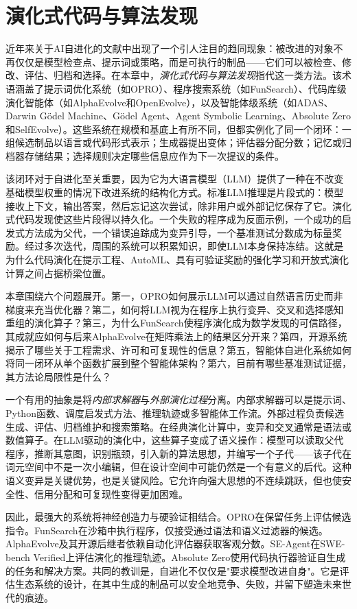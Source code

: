 
\section{演化式代码与算法发现}
\label{sec:evolutionary-code-algorithm-discovery}

近年来关于AI自进化的文献中出现了一个引人注目的趋同现象：被改进的对象不再仅仅是模型检查点、提示词或策略，而是可执行的制品——它们可以被检查、修改、评估、归档和选择。在本章中，\emph{演化式代码与算法发现}指代这一类方法。该术语涵盖了提示词优化系统（如OPRO）、程序搜索系统（如FunSearch）、代码库级演化智能体（如AlphaEvolve和OpenEvolve），以及智能体级系统（如ADAS、Darwin G{\"o}del Machine、G{\"o}del Agent、Agent Symbolic Learning、Absolute Zero和SelfEvolve）。这些系统在规模和基底上有所不同，但都实例化了同一个闭环：一组候选制品以语言或代码形式表示；生成器提出变体；评估器分配分数；记忆或归档器存储结果；选择规则决定哪些信息应作为下一次提议的条件。

该闭环对于自进化至关重要，因为它为大语言模型（LLM）提供了一种在不改变基础模型权重的情况下改进系统的结构化方式。标准LLM推理是片段式的：模型接收上下文，输出答案，然后忘记这次尝试，除非用户或外部记忆保存了它。演化式代码发现使这些片段得以持久化。一个失败的程序成为反面示例，一个成功的启发式方法成为父代，一个错误追踪成为变异引导，一个基准测试分数成为标量奖励。经过多次迭代，周围的系统可以积累知识，即使LLM本身保持冻结。这就是为什么代码演化在提示工程、AutoML、具有可验证奖励的强化学习和开放式演化计算之间占据桥梁位置。

本章围绕六个问题展开。第一，OPRO如何展示LLM可以通过自然语言历史而非梯度来充当优化器？第二，如何将LLM视为在程序上执行变异、交叉和选择感知重组的演化算子？第三，为什么FunSearch使程序演化成为数学发现的可信路径，其成就应如何与后来AlphaEvolve在矩阵乘法上的结果区分开来？第四，开源系统揭示了哪些关于工程需求、许可和可复现性的信息？第五，智能体自进化系统如何将同一闭环从单个函数扩展到整个智能体架构？第六，目前有哪些基准测试证据，其方法论局限性是什么？

一个有用的抽象是将\emph{内部求解器}与\emph{外部演化过程}分离。内部求解器可以是提示词、Python函数、调度启发式方法、推理轨迹或多智能体工作流。外部过程负责候选生成、评估、归档维护和搜索策略。在经典演化计算中，变异和交叉通常是语法或数值算子。在LLM驱动的演化中，这些算子变成了语义操作：模型可以读取父代程序，推断其意图，识别瓶颈，引入新的算法思想，并编写一个子代——该子代在词元空间中不是一次小编辑，但在设计空间中可能仍然是一个有意义的后代。这种语义变异是关键优势，也是关键风险。它允许向强大思想的不连续跳跃，但也使安全性、信用分配和可复现性变得更加困难。

因此，最强大的系统将神经创造力与硬验证相结合。OPRO在保留任务上评估候选指令。FunSearch在沙箱中执行程序，仅接受通过语法和语义过滤器的候选。AlphaEvolve及其开源后继者依赖自动化评估器获取客观分数。SE-Agent在SWE-bench Verified上评估演化的推理轨迹。Absolute Zero使用代码执行器验证自生成的任务和解决方案。共同的教训是，自进化不仅仅是"要求模型改进自身"。它是评估生态系统的设计，在其中生成的制品可以安全地竞争、失败，并留下塑造未来世代的痕迹。

